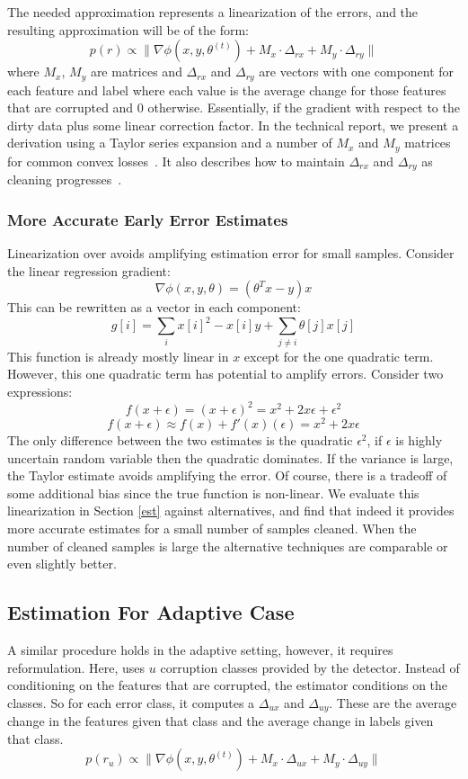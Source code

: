 The needed approximation represents a linearization of the errors, and the resulting approximation will be of the form:
\[
p(r)\propto\|\nabla\phi(x,y,\theta^{(t)}) + M_x \cdot \Delta_{rx} +  M_y \cdot \Delta_{ry}\|
\]
where $M_x$, $M_y$ are matrices and $\Delta_{rx}$ and $\Delta_{ry}$ are vectors with one component for each feature and label where each value is the average change for those features that are corrupted and 0 otherwise.
Essentially, if the gradient with respect to the dirty data plus some linear correction factor.
In the technical report, we present a derivation using a Taylor series expansion and a number of $M_x$ and $M_y$ matrices for common convex losses~\cite{activecleanarxiv}.
It also describes how to maintain $\Delta_{rx}$ and $\Delta_{ry}$ as cleaning progresses~\cite{activecleanarxiv}.

\subsubsection{More Accurate Early Error Estimates}\label{acc}
Linearization over avoids amplifying estimation error for small samples.
Consider the linear regression gradient:
\[
\nabla\phi(x,y,\theta) = (\theta^Tx - y)x
\]
This can be rewritten as a vector in each component:
\[
g[i] = \sum_{i} x[i]^2-x[i]y + \sum_{j \ne i} \theta[j]x[j]
\]
This function is already mostly linear in $x$ except for the one quadratic term.
However, this one quadratic term has potential to amplify errors.
Consider two expressions:
\[
f(x+\epsilon) = (x+\epsilon)^2 = x^2 + 2x\epsilon + \epsilon^2
\]
\[
f(x+\epsilon) \approx f(x) + f'(x)(\epsilon) = x^2 + 2x\epsilon
\]
The only difference between the two estimates is the quadratic $\epsilon^2$, if $\epsilon$ is highly uncertain random variable then the quadratic dominates.
If the variance is large, the Taylor estimate avoids amplifying the error.
Of course, there is a tradeoff of some additional bias since the true function is non-linear.
We evaluate this linearization in Section \ref{est} against alternatives, and find that indeed it provides more accurate estimates for a small number of samples cleaned.
When the number of cleaned samples is large the alternative techniques are comparable or even slightly better.


\iffalse
\subsection{Estimation For Adaptive Case}
A similar procedure holds in the adaptive setting, however, it requires reformulation.
Here, \sys uses $u$ corruption classes provided by the detector.
Instead of conditioning on the features that are corrupted, the estimator conditions on the classes.
So for each error class, it computes a $\Delta_{ux}$ and $\Delta_{uy}$.
These are the average change in the features given that class and the average change in labels given that class.
\[
p(r_u)\propto\|\nabla\phi(x,y,\theta^{(t)}) + M_x \cdot \Delta_{ux} +  M_y \cdot \Delta_{uy}\|
\] 

